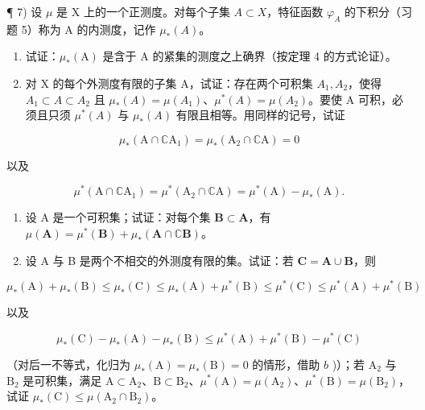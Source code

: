 ¶ 7) 设 \(\mu\) 是 X 上的一个正测度。对每个子集 \(A \subset X\)，特征函数 \(\varphi_A\) 的下积分（习题 5）称为 A 的内测度，记作 \(\mu_*(A)\)。

\begin{enumerate}
\def\labelenumi{\alph{enumi})}
\item
  试证：\(\mu_{*}(\mathrm{A})\) 是含于 A 的紧集的测度之上确界（按定理 4 的方式论证）。
\item
  对 X 的每个外测度有限的子集 A，试证：存在两个可积集 \(A_{1}, A_{2}\)，使得 \(A_{1} \subset A \subset A_{2}\) 且 \(\mu_{*}(A) = \mu(A_{1})\)、\(\mu^{*}(A) = \mu(A_{2})\)。要使 A 可积，必须且只须 \(\mu^{*}(A)\) 与 \(\mu_{*}(A)\) 有限且相等。用同样的记号，试证
\end{enumerate}

\[
\mu_ {*} (\mathrm{A} \cap \mathbb {C} \mathrm{A} _ {1}) = \mu_ {*} (\mathrm{A} _ {2} \cap \mathbb {C} \mathrm{A}) = 0
\]

以及

\[
\mu^ {*} (\mathrm{A} \cap \mathbb {C} \mathrm{A} _ {1}) = \mu^ {*} (\mathrm{A} _ {2} \cap \mathbb {C} \mathrm{A}) = \mu^ {*} (\mathrm{A}) - \mu_ {*} (\mathrm{A}).
\]

\begin{enumerate}
\def\labelenumi{\alph{enumi})}
\setcounter{enumi}{2}
\item
  设 A 是一个可积集；试证：对每个集 \(\mathbf{B} \subset \mathbf{A}\)，有 \(\mu(\mathbf{A}) = \mu^{*}(\mathbf{B}) + \mu_{*}(\mathbf{A} \cap \mathbb{C}\mathbf{B})\)。
\item
  设 A 与 B 是两个不相交的外测度有限的集。试证：若 \(\mathbf{C} = \mathbf{A} \cup \mathbf{B}\)，则
\end{enumerate}

\[
\mu_ {*} (\mathrm{A}) + \mu_ {*} (\mathrm{B}) \leqslant \mu_ {*} (\mathrm{C}) \leqslant \mu_ {*} (\mathrm{A}) + \mu^ {*} (\mathrm{B}) \leqslant \mu^ {*} (\mathrm{C}) \leqslant \mu^ {*} (\mathrm{A}) + \mu^ {*} (\mathrm{B})
\]

以及

\[
\mu_ {*} (\mathrm{C}) - \mu_ {*} (\mathrm{A}) - \mu_ {*} (\mathrm{B}) \leqslant \mu^ {*} (\mathrm{A}) + \mu^ {*} (\mathrm{B}) - \mu^ {*} (\mathrm{C})
\]

（对后一不等式，化归为 \(\mu_{*}(\mathrm{A}) = \mu_{*}(\mathrm{B}) = 0\) 的情形，借助 \(b\) )）；若 \(\mathrm{A}_2\) 与 \(\mathrm{B}_2\) 是可积集，满足 \(\mathrm{A} \subset \mathrm{A}_2\)、\(\mathrm{B} \subset \mathrm{B}_2\)、\(\mu^{*}(\mathrm{A}) = \mu(\mathrm{A}_2)\)、\(\mu^{*}(\mathrm{B}) = \mu(\mathrm{B}_2)\)，试证 \(\mu_{*}(\mathrm{C}) \leqslant \mu(\mathrm{A}_2 \cap \mathrm{B}_2)\)。

